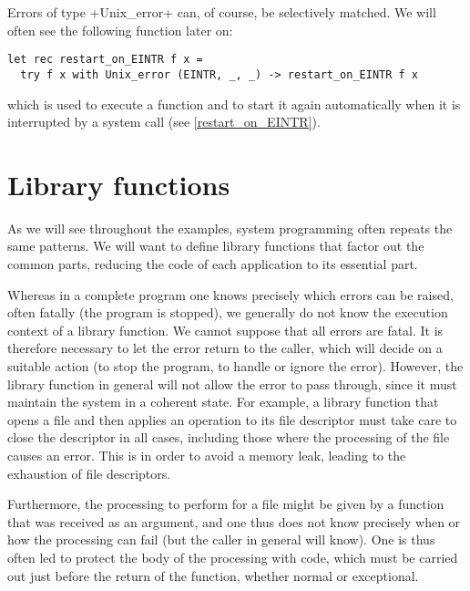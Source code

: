 Errors of type \ml+Unix_error+  can, of course, be
selectively matched. We will often see the following
function later on:
%
\begin{lstlisting}
let rec restart_on_EINTR f x = 
  try f x with Unix_error (EINTR, _, _) -> restart_on_EINTR f x 
\end{lstlisting}
%
which is used to execute a function and to start it again automatically
when it is interrupted by a system call (see \ref{restart_on_EINTR}).

\section{Library functions}

As we will see throughout the examples, system programming often
repeats the same patterns. We will want to define library functions
that factor out the common parts, reducing the code of each
application to its essential part.

Whereas in a complete program one knows precisely which errors can be
raised, often fatally (the program is stopped), we generally do not
know the execution context of a library function. We cannot suppose
that all errors are fatal. It is therefore necessary to let the error
return to the caller, which will decide on a suitable action (to stop
the program, to handle or ignore the error). However, the library
function in general will not allow the error to pass through, since it
must maintain the system in a coherent state. For example, a library
function that opens a file and then applies an operation to its file
descriptor must take care to close the descriptor in all cases,
including those where the processing of the file causes an error. This
is in order to avoid a memory leak, leading to the exhaustion of file
descriptors.

Furthermore, the processing to perform for a file might be given by a
function that was received as an argument, and one thus does not know
precisely when or how the processing can fail (but the caller in
general will know). One is thus often led to protect the body of the
processing with  code, which must be carried out
just before the return of the function, whether normal or exceptional.

